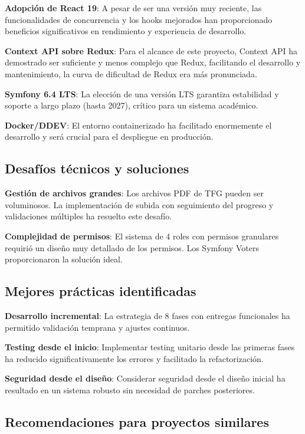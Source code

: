 \documentclass[12pt,a4paper,oneside]{report}
\begin{document}
\textbf{Adopción de React 19}: A pesar de ser una versión muy reciente,
las funcionalidades de concurrencia y los hooks mejorados han
proporcionado beneficios significativos en rendimiento y experiencia de
desarrollo.

\textbf{Context API sobre Redux}: Para el alcance de este proyecto,
Context API ha demostrado ser suficiente y menos complejo que Redux,
facilitando el desarrollo y mantenimiento, la curva de dificultad de Redux era más pronunciada.

\textbf{Symfony 6.4 LTS}: La elección de una versión LTS garantiza
estabilidad y soporte a largo plazo (hasta 2027), crítico para un sistema académico.

\textbf{Docker/DDEV}: El entorno containerizado ha facilitado
enormemente el desarrollo y será crucial para el despliegue en
producción.

\subsection{Desafíos técnicos y
soluciones}\label{desafuxedos-tuxe9cnicos-y-soluciones}

\textbf{Gestión de archivos grandes}: Los archivos PDF de TFG pueden ser
voluminosos. La implementación de subida con seguimiento del progreso y
validaciones múltiples ha resuelto este desafío.

\textbf{Complejidad de permisos}: El sistema de 4 roles con permisos
granulares requirió un diseño muy detallado de los permisos. Los Symfony Voters
proporcionaron la solución ideal.

\subsection{Mejores prácticas
identificadas}\label{mejores-pruxe1cticas-identificadas}

\textbf{Desarrollo incremental}: La estrategia de 8 fases con entregas
funcionales ha permitido validación temprana y ajustes continuos.

\textbf{Testing desde el inicio}: Implementar testing unitario desde las
primeras fases ha reducido significativamente los errores y facilitado
la refactorización.

\textbf{Seguridad desde el diseño}: Considerar seguridad desde el diseño
inicial ha resultado en un sistema robusto sin necesidad de parches
posteriores.

\subsection{Recomendaciones para proyectos
similares}\label{recomendaciones-para-proyectos-similares}
\end{document}
